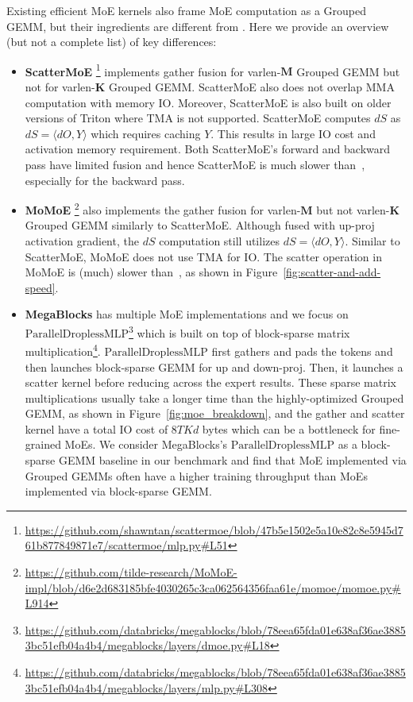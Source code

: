 
Existing efficient MoE kernels also frame MoE computation as a Grouped GEMM, but their ingredients are different from \Algname. Here we provide an overview (but not a complete list) of key differences:

\begin{itemize}
    \item \textbf{ScatterMoE} \citep{tan2024scattered}\footnote{\scriptsize \url{https://github.com/shawntan/scattermoe/blob/47b5e1502e5a10e82c8e5945d761b877849871e7/scattermoe/mlp.py\#L51}} implements gather fusion for varlen-$\mathbf{M}$ Grouped GEMM but not for varlen-$\mathbf{K}$ Grouped GEMM. ScatterMoE also does not overlap MMA computation with memory IO. Moreover, ScatterMoE is also built on older versions of Triton where TMA is not supported. ScatterMoE computes $dS$ as $dS = \langle dO, Y \rangle$ which requires caching $Y$. This results in large IO cost and activation memory requirement. Both ScatterMoE's forward and backward pass have limited fusion and hence ScatterMoE is much slower than~\Algname, especially for the backward pass.

    \item \textbf{MoMoE} \citep{costin2025momoe}\footnote{\scriptsize \url{https://github.com/tilde-research/MoMoE-impl/blob/d6e2d683185bfe4030265c3ca062564356faa61e/momoe/momoe.py\#L914}} also implements the gather fusion for varlen-$\mathbf{M}$ but not varlen-$\mathbf{K}$ Grouped GEMM similarly to ScatterMoE. Although fused with up-proj activation gradient, the $dS$ computation still utilizes $dS = \langle dO, Y \rangle$. Similar to ScatterMoE, MoMoE does not use TMA for IO. The scatter operation in MoMoE is (much) slower than~\Algname, as shown in Figure~\ref{fig:scatter-and-add-speed}.
    
    \item \textbf{MegaBlocks} \citep{gale2023megablocks} has multiple MoE implementations and we focus on $\mathrm{ParallelDroplessMLP}$\footnote{\scriptsize \url{https://github.com/databricks/megablocks/blob/78eea65fda01e638af36ae38853bc51efb04a4b4/megablocks/layers/dmoe.py\#L18}} which is built on top of block-sparse matrix multiplication\footnote{\scriptsize\url{https://github.com/databricks/megablocks/blob/78eea65fda01e638af36ae38853bc51efb04a4b4/megablocks/layers/mlp.py\#L308}}. $\mathrm{ParallelDroplessMLP}$ first gathers and pads the tokens and then launches block-sparse GEMM for up and down-proj. Then, it launches a scatter kernel before reducing across the expert results. These sparse matrix multiplications usually take a longer time than the highly-optimized Grouped GEMM, as shown in Figure~\ref{fig:moe_breakdown}, and the gather and scatter kernel have a total IO cost of $8TKd$ bytes which can be a bottleneck for fine-grained MoEs. We consider MegaBlocks's $\mathrm{ParallelDroplessMLP}$ as a block-sparse GEMM baseline in our benchmark and find that MoE implemented via Grouped GEMMs often have a higher training throughput than MoEs implemented via block-sparse GEMM. 


\end{itemize}
